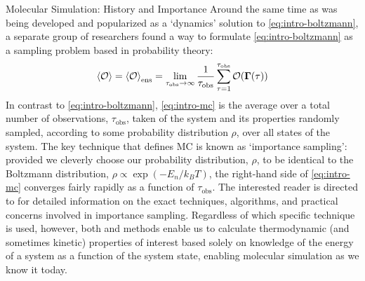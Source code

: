 \begin{section}{Molecular Simulation: History and Importance}
Around the same time as \md was being developed and popularized as a `dynamics' solution to
\cref{eq:intro-boltzmann}, a separate group of
researchers\cite{Metropolis1953} found a way to
formulate \cref{eq:intro-boltzmann} as a sampling problem based in probability
theory: 
\cite{Harrison2010,allen1989computer}
%
\begin{align}
\label{eq:intro-mc}
\braket{\mathcal{O}} = \braket{\mathcal{O}}_{\text{ens}} 
= \lim_{\tau_{\text{obs}} \to \infty} \frac{1}{\tau_{\text{obs}}}
\sum\limits_{\tau = 1}^{\tau_{\text{obs}}}
\mathcal{O}(\bm{\Gamma}(\tau))
\end{align}
%
In contrast to \cref{eq:intro-boltzmann}, \cref{eq:intro-mc} is the average
over a total number of observations, ${\tau_{\text{obs}}}$, taken of the
system and its properties randomly sampled, according to some probability
distribution $\rho$, over all states of the system.  The key technique that
defines MC is known as `importance sampling': provided we cleverly choose our
probability distribution, $\rho$, to be identical to the Boltzmann
distribution, $\rho \propto \exp (-E_n/k_BT)$, the right-hand side of
\cref{eq:intro-mc} converges fairly rapidly as a function of
${\tau_{\text{obs}}}$.  The interested reader is directed to
\citet{allen1989computer} for detailed information
on the exact techniques, algorithms, and practical concerns involved in
importance sampling.  
%
Regardless of which specific technique is used, however, both
\md and \mc methods
enable us to calculate thermodynamic (and sometimes kinetic) properties of
interest based solely on knowledge of the energy of a system as a function of
the system state, enabling molecular simulation as we know it today.





\end{section}
